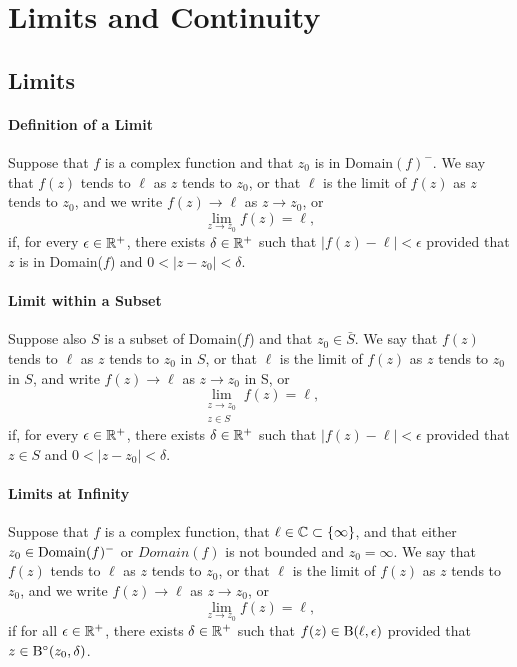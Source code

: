 \section{Limits and Continuity}
\subsection{Limits}
\paragraph{Definition of a Limit}
Suppose that \(f\) is a complex function and that \(z_0\) is in Domain\((f)^-\). We say that \(f(z)\) tends to \(\ell\) as \(z\) tends to \(z_0\), or that \(\ell\) is the limit of \(f(z)\) as \(z\) tends to \(z_0\), and we write \(f(z) \to \ell\) as \(z \to z_0\), or
\[\lim_{z \to z_0}f(z) = \ell,\]
if, for every \(\epsilon \in \mathbb{R}^+\), there exists \(\delta \in \mathbb{R}^+\) such that \(|f(z) - \ell| < \epsilon\) provided that \(z\) is in Domain(\(f\)) and \(0 < |z - z_0 | < \delta\).

\paragraph{Limit within a Subset}
Suppose also \(S\) is a subset of Domain(\(f\)) and that \(z_0 \in \bar{S}\). We say that \(f(z)\) tends to \(\ell\) as \(z\) tends to \(z_0\) in \(S\), or that \(\ell\) is the limit of \(f(z)\) as \(z\) tends to \(z_0\) in \(S\), and write \(f(z) \to \ell\) as \(z \to z_0\) in S, or
\[\lim_{\substack{z \to z_0 \\ z \in S}} f(z) = \ell,\]
if, for every \(\epsilon \in \mathbb{R}^+\), there exists \(\delta \in \mathbb{R}^+\) such that \(|f(z) - \ell| < \epsilon\) provided that \(z \in S\) and \(0 < |z - z_0| < \delta\).

\paragraph{Limits at Infinity}
Suppose that \(f\) is a complex function, that \(\ell \in \mathbb{C} \subset \{\infty\}\), and that either \(z_0 \in \mathrm{Domain}(f)^-\) or \(Domain(f)\) is not bounded and \(z_0 = \infty\). We say that \(f(z)\) tends to \(\ell\) as \(z\) tends to \(z_0\), or that \(\ell\) is the limit of \(f(z)\) as \(z\) tends to \(z_0\), and we write \(f(z) \to \ell\) as \(z \to z_0\), or
\[\lim_{z \to z_0} f(z) = \ell,\]
if for all \(\epsilon \in \mathbb{R}^+\), there exists \(\delta \in \mathbb{R}^+\) such that \(f(z) \in \mathrm{B}(\ell, \epsilon)\) provided that \(z \in \mathrm{B}^\circ(z_0, \delta)\).


